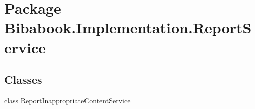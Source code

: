 \hypertarget{namespace_bibabook_1_1_implementation_1_1_report_service}{}\section{Package Bibabook.\+Implementation.\+Report\+Service}
\label{namespace_bibabook_1_1_implementation_1_1_report_service}
\subsection*{Classes}
\begin{DoxyCompactItemize}
\item 
class \hyperlink{class_bibabook_1_1_implementation_1_1_report_service_1_1_report_inappropriate_content_service}{Report\+Inappropriate\+Content\+Service}
\end{DoxyCompactItemize}
